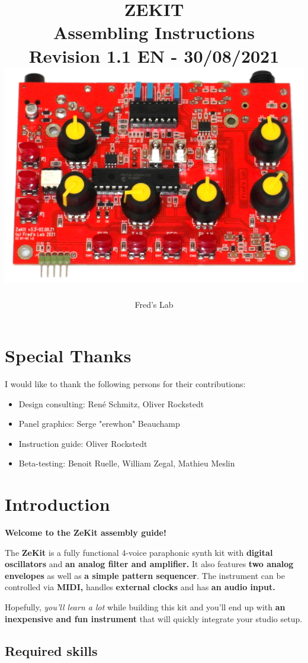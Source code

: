 \documentclass{scrartcl}
\title{
    \vspace*{4cm}
    \huge{ZEKIT} \\
    Assembling Instructions \\
    \vspace*{0.25cm}
    \small{Revision 1.1 EN - 30/08/2021} \\
    \vspace*{0.5cm}
    \includegraphics[scale=0.2]{assets/zekit-assembled.jpg}
}
\author{Fred's Lab}
\begin{document}
\maketitle

\pagebreak


\tableofcontents
\pagebreak


\section{Special Thanks}

I would like to thank the following persons for their contributions:

\begin{itemize}
    \item Design consulting: René Schmitz, Oliver Rockstedt
    \item Panel graphics: Serge "erewhon" Beauchamp
    \item Instruction guide: Oliver Rockstedt
    \item Beta-testing: Benoit Ruelle, William Zegal, Mathieu Meslin
\end{itemize}


\section{Introduction}

\textbf{Welcome to the ZeKit assembly guide!}

The \textbf{ZeKit} is a fully functional 4-voice paraphonic synth kit with \textbf{digital oscillators} and \textbf{an analog filter and amplifier.}
It also features \textbf{two analog envelopes} as well as \textbf{a simple pattern sequencer}.
The instrument can be controlled via \textbf{MIDI,} handles \textbf{external clocks} and has \textbf{an audio input.}

Hopefully, \emph{you'll learn a lot} while building this kit and you'll end up with \textbf{an inexpensive and fun instrument} that will quickly integrate your studio setup.

\subsection{Required skills}
\end{document}
